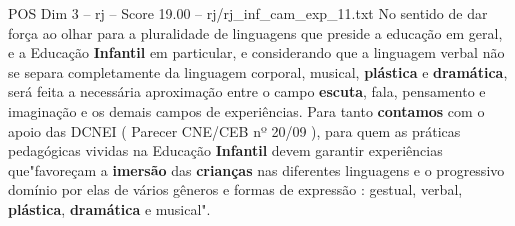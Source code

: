 \begin{textsample}{POS Dim 3 – rj – Score 19.00 – rj/rj\_inf\_cam\_exp\_11.txt}
No sentido de dar força ao olhar para a pluralidade de linguagens que preside a educação em geral, e a Educação \textbf{Infantil} em particular, e considerando que a linguagem verbal não se separa completamente da linguagem corporal, musical, \textbf{plástica} e \textbf{dramática}, será feita a necessária aproximação entre o campo \textbf{escuta}, fala, pensamento e imaginação e os demais campos de experiências.
Para tanto \textbf{contamos} com o apoio das DCNEI ( Parecer CNE/CEB nº 20/09 ), para quem as práticas pedagógicas vividas na Educação \textbf{Infantil} devem garantir experiências que"favoreçam a \textbf{imersão} das \textbf{crianças} nas diferentes linguagens e o progressivo domínio por elas de vários gêneros e formas de expressão : gestual, verbal, \textbf{plástica}, \textbf{dramática} e musical".

\end{textsample}
